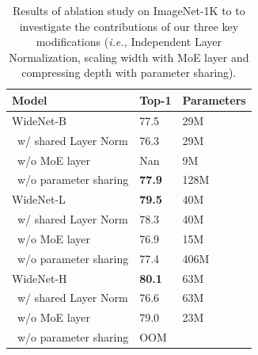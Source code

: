 \documentclass[letterpaper]{article} %
\newcommand{\ie}{\emph{i.e.,}\xspace}
\begin{document}
\begin{table}[t]
\centering
\caption{Results of ablation study on ImageNet-1K to to investigate the contributions of our three key modifications (\ie Independent Layer Normalization, scaling width with MoE layer and compressing depth with parameter sharing).}
\label{tbl-abaltion-pretraining-ImageNet}
\begin{tabular}{l|ll}
\toprule
Model                                   & Top-1 & Parameters \\ \midrule
WideNet-B               & 77.5 & 29M        \\
~w/ shared Layer Norm & 76.3          & 29M                 \\
~w/o MoE layer                    & Nan            & 9M                  \\
~w/o parameter sharing            & \textbf{77.9} & 128M                \\ \midrule
WideNet-L              & \textbf{79.5} & 40M                 \\
~w/ shared Layer Norm    &      78.3          &   40M                  \\
~w/o MoE layer                    & 76.9          & 15M        \\
~w/o parameter sharing            & 77.4          & 406M                \\ \midrule
WideNet-H              & \textbf{80.1} & 63M                 \\
~w/ shared Layer Norm   &     76.6           &     63M                \\
~w/o MoE layer                    & 79.0          & 23M        \\
~w/o parameter sharing            & OOM            &      \\
\bottomrule
\end{tabular}
\end{table}
\end{document}
